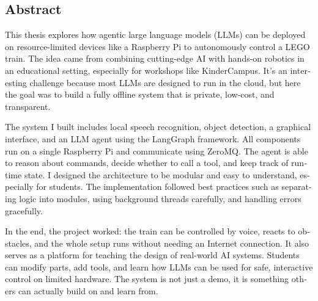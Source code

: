 

\begin{otherlanguage}{american}
	\chapter*{Abstract}
	
This thesis explores how agentic large language models (LLMs) can be deployed on resource-limited devices like a Raspberry Pi to autonomously control a LEGO train. The idea came from combining cutting-edge AI with hands-on robotics in an educational setting, especially for workshops like KinderCampus. It’s an interesting challenge because most LLMs are designed to run in the cloud, but here the goal was to build a fully offline system that is private, low-cost, and transparent.

The system I built includes local speech recognition, object detection, a graphical interface, and an LLM agent using the LangGraph framework. All components run on a single Raspberry Pi and communicate using ZeroMQ. The agent is able to reason about commands, decide whether to call a tool, and keep track of runtime state. I designed the architecture to be modular and easy to understand, especially for students. The implementation followed best practices such as separating logic into modules, using background threads carefully, and handling errors gracefully.

In the end, the project worked: the train can be controlled by voice, reacts to obstacles, and the whole setup runs without needing an Internet connection. It also serves as a platform for teaching the design of real-world AI systems. Students can modify parts, add tools, and learn how LLMs can be used for safe, interactive control on limited hardware. The system is not just a demo, it is something others can actually build on and learn from.

\end{otherlanguage}
